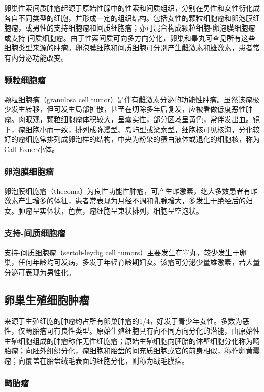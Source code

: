 卵巢性索间质肿瘤起源于原始性腺中的性索和间质组织，分别在男性和女性衍化成各自不同类型的细胞，并形成一定的组织结构。包括女性的颗粒细胞瘤和卵泡膜细胞瘤，或男性的支持细胞瘤和间质细胞瘤；亦可混合构成颗粒细胞-卵泡膜细胞瘤或支持-间质细胞瘤。由于性索间质可向多方向分化，卵巢和睾丸可查见所有这些细胞类型来源的肿瘤。卵泡膜细胞和间质细胞可分别产生雌激素和雄激素，患者常有内分泌功能改变。

\subsubsection{颗粒细胞瘤}

颗粒细胞瘤（granulosa cell
tumor）是伴有雌激素分泌的功能性肿瘤。虽然该瘤极少发生转移，但可发生局部扩散，甚至在切除多年后复发，应被看做低度恶性肿瘤。肉眼观，颗粒细胞瘤体积较大，呈囊实性，部分区域呈黄色，常伴发出血。镜下，瘤细胞小而一致，排列成弥漫型、岛屿型或梁索型，细胞核可见核沟，分化较好的瘤细胞常排列成卵泡样的结构，中央为粉染的蛋白液体或退化的细胞核，称为Call-Exner小体。

\subsubsection{卵泡膜细胞瘤}

卵泡膜细胞瘤（thecoma）为良性功能性肿瘤，可产生雌激素，绝大多数患者有雌激素产生增多的体征，患者常表现为月经不调和乳腺增大，多发生于绝经后的妇女。肿瘤呈实体状，色黄，瘤细胞呈束状排列，细胞呈空泡状。

\subsubsection{支持-间质细胞瘤}

支持-间质细胞瘤（sertoli-leydig cell
tumors）主要发生在睾丸，较少发生于卵巢，任何年龄均可发病，多发于年轻育龄期妇女。该瘤可分泌少量雄激素，若大量分泌可表现为男性化。

\subsection{卵巢生殖细胞肿瘤}

来源于生殖细胞的肿瘤约占所有卵巢肿瘤的1/4，好发于青少年女性。多数为恶性，仅畸胎瘤可有良性类型。原始生殖细胞具有向不同方向分化的潜能，由原始性生殖细胞组成的肿瘤称作无性细胞瘤；原始生殖细胞向胚胎的体壁细胞分化称为畸胎瘤；向胚外组织分化，瘤细胞和胎盘的间充质细胞或它的前身相似，称作卵黄囊瘤；向覆盖在胎盘绒毛表面的细胞分化，则称为绒毛膜癌。

\subsubsection{畸胎瘤}

